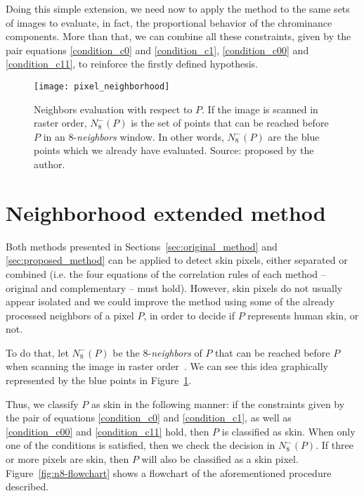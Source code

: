Doing this simple extension, we need now to apply the method to the same sets of images to evaluate, in fact, the proportional behavior of the chrominance components. More than that, we can combine all these constraints, given by the pair equations \ref{condition_c0} and \ref{condition_c1}, \ref{condition_c00} and \ref{condition_c11}, to reinforce the firstly defined hypothesis.


\begin{figure}[!htp]
    \centering
    \texttt{[image: pixel\_neighborhood]}
    \caption[Neighbors evaluation with respect to a pixel $P$]{Neighbors evaluation with respect to $P$. If the image is scanned in raster order, $N_8^-(P)$ is the set of points that can be reached before $P$ in an 8-\textit{neighbors} window. In other words, $N_8^-(P)$ are the blue points which we already have evaluated. Source: proposed by the author.}
    \label{fig:pixel_neighborhood}
\end{figure}


\section{Neighborhood extended method}
\label{sec:neighborhood_extended_method}
Both methods presented in Sections~\ref{sec:original_method} and \ref{sec:proposed_method} can be applied to detect skin pixels, either separated or combined (i.e. the four equations of the correlation rules of each method -- original and complementary -- must hold). However, skin pixels do not usually appear isolated and we could improve the method using some of the already processed neighbors of a pixel $P$, in order to decide if $P$ represents human skin, or not.

To do that, let $N_8^-(P)$ be the 8-\textit{neighbors} of $P$ that can be reached before $P$ when scanning the image in raster order~\citep{rosenfeld:66}. We can see this idea graphically represented by the blue points in Figure~\ref{fig:pixel_neighborhood}.

Thus, we classify $P$ as skin in the following manner: if the constraints given by the pair of equations \ref{condition_c0} and \ref{condition_c1}, as well as \ref{condition_c00} and \ref{condition_c11} hold, then $P$ is classified as skin. When only one of the conditions is satisfied, then we check the decision in $N_8^-(P)$. If three or more pixels are skin, then $P$ will also be classified as a skin pixel. Figure~\ref{fig:n8-flowchart} shows a flowchart of the aforementioned procedure described.

